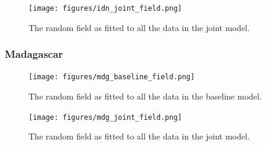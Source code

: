 \documentclass[10pt,a4]{article}
\begin{document}
\begin{figure}[h!]
\centering

\texttt{[image: figures/idn\_joint\_field.png]}

\caption{The random field as fitted to all the data in the joint model.}
\label{jointfieldidn}
\end{figure}



\clearpage
\subsubsection{Madagascar}





\begin{figure}[h!]
\centering

\texttt{[image: figures/mdg\_baseline\_field.png]}

\caption{The random field as fitted to all the data in the baseline model.}
\label{baselinefieldmdg}
\end{figure}




\begin{figure}[h!]
     \centering
     \label{gpsencov}
\end{figure}




\begin{figure}[h!]
\centering

\texttt{[image: figures/mdg\_joint\_field.png]}

\caption{The random field as fitted to all the data in the joint model.}
\label{jointfieldidn}
\end{figure}
\end{document}
